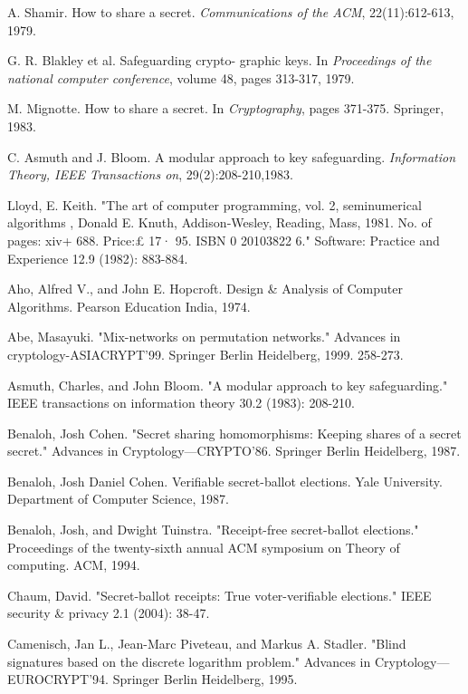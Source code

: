 \documentclass[conference]{IEEEtran}
\begin{document}
\begin{thebibliography}{50}

 A. Shamir. How to share a secret.\emph{ Communications of the ACM}, 22(11):612-613, 1979.

G. R. Blakley et al. Safeguarding crypto-
graphic keys. In \emph{Proceedings of the national
	computer conference}, volume 48, pages 313-317, 1979.

M. Mignotte. How to share a secret. In \emph{Cryptography}, pages 371-375. Springer, 1983.

C. Asmuth and J. Bloom. A modular approach to key safeguarding. \emph{Information Theory, IEEE Transactions on}, 29(2):208-210,1983.

Lloyd, E. Keith. "The art of computer programming, vol. 2, seminumerical algorithms , Donald E. Knuth, Addison‐Wesley, Reading, Mass, 1981. No. of pages: xiv+ 688. Price:£ 17· 95. ISBN 0 20103822 6." Software: Practice and Experience 12.9 (1982): 883-884.

Aho, Alfred V., and John E. Hopcroft. Design \& Analysis of Computer Algorithms. Pearson Education India, 1974.

Abe, Masayuki. "Mix-networks on permutation networks." Advances in cryptology-ASIACRYPT’99. Springer Berlin Heidelberg, 1999. 258-273.

Asmuth, Charles, and John Bloom. "A modular approach to key safeguarding." IEEE transactions on information theory 30.2 (1983): 208-210.

Benaloh, Josh Cohen. "Secret sharing homomorphisms: Keeping shares of a secret secret." Advances in Cryptology—CRYPTO’86. Springer Berlin Heidelberg, 1987.

Benaloh, Josh Daniel Cohen. Verifiable secret-ballot elections. Yale University. Department of Computer Science, 1987.

Benaloh, Josh, and Dwight Tuinstra. "Receipt-free secret-ballot elections." Proceedings of the twenty-sixth annual ACM symposium on Theory of computing. ACM, 1994.

Chaum, David. "Secret-ballot receipts: True voter-verifiable elections." IEEE security \& privacy 2.1 (2004): 38-47.

Camenisch, Jan L., Jean-Marc Piveteau, and Markus A. Stadler. "Blind signatures based on the discrete logarithm problem." Advances in Cryptology—EUROCRYPT'94. Springer Berlin Heidelberg, 1995.


\end{thebibliography}
\end{document}
